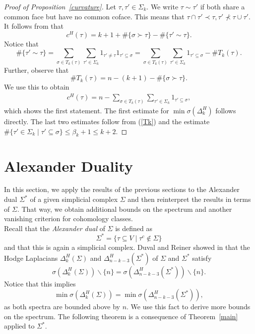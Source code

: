 \documentclass[10pt]{amsart}
\theoremstyle{definition}
\begin{document}
\begin{proof}[Proof of Proposition~\ref{curvature}]

Let $\tau,\tau'\in\Sigma_k.$ We write $\tau\sim\tau'$ if both share a common face but have no common coface. This means that $\tau\cap\tau'\prec\tau,\tau'\nprec\tau\cup\tau'.$
It follows from \cite[Lemma 3.13]{BK} that 
\[c^H(\tau) = k+1+\#\lbrace\sigma\succ\tau\rbrace-\#\lbrace\tau'\sim\tau\rbrace.\]
Notice that \[\#\lbrace\tau'\sim\tau\rbrace = \sum_{\sigma\in T_k(\tau)}\sum_{\tau'\in\Sigma_k}1_{\tau'\neq\tau}1_{\tau'\subseteq\sigma} = \sum_{\sigma\in T_k(\tau)}\sum_{\tau'\in\Sigma_k}1_{\tau'\subseteq\sigma}-\#T_k(\tau).\]
Further, observe that 
\begin{equation}\label{Tk}
    \#T_k(\tau) = n-(k+1)-\#\lbrace\sigma\succ\tau\rbrace.
\end{equation}
We use this to obtain
\begin{align*}
    c^H(\tau) = n-\sum_{\sigma\in T_k(\tau)}\sum_{\tau'\in\Sigma_k}1_{\tau'\subseteq\sigma},
\end{align*}
which shows the first statement. The first estimate for $\min\sigma(\Delta^H_k)$ follows directly. The last two estimates follow from (\ref{Tk}) and the estimate $\#\lbrace \tau'\in\Sigma_k\mid\tau'\subseteq\sigma\rbrace\leq \beta_k+1\leq k+2.$
\end{proof}

\section{Alexander Duality}\label{alex}

In this section, we apply the results of the previous sections to the Alexander dual $\Sigma^\ast$ of a given simplicial complex $\Sigma$ and then reinterpret the results in terms of $\Sigma.$ That way, we obtain additional bounds on the spectrum and another vanishing criterion for cohomology classes.\\
Recall that the \textit{Alexander dual} of $\Sigma$ is defined as 
\[\Sigma^* = \lbrace\tau\subseteq V\mid \tau^c\notin\Sigma\rbrace\] and that this is again a simplicial complex.
Duval and Reiner showed in \cite[Corollary~4.7]{DuvRei} that the Hodge Laplacians $\Delta^H_k(\Sigma)$ and $\Delta^H_{n-k-3}(\Sigma^*)$ of $\Sigma$ and $\Sigma^*$ satisfy \[\sigma(\Delta^H_k(\Sigma))\backslash\lbrace n\rbrace = \sigma(\Delta^H_{n-k-3}(\Sigma^*))\backslash\lbrace n\rbrace.\] Notice that this implies \[\min\sigma(\Delta^H_k(\Sigma)) =\min \sigma(\Delta^H_{n-k-3}(\Sigma^*)),\] as both spectra are bounded above by $n.$ We use this fact to derive more bounds on the spectrum.
The following theorem is a consequence of Theorem~\ref{main} applied to $\Sigma^*.$
\end{document}
